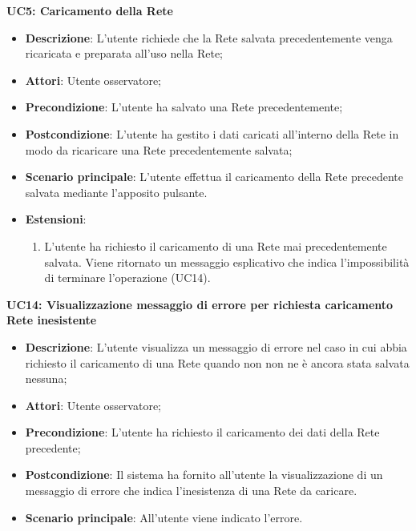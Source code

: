 \textbf{UC5: Caricamento della Rete}\mbox{}
\label{UC5: Caricamento della Rete}
\noindent
\begin{itemize}
\item \textbf{Descrizione}: L'utente richiede che la Rete salvata precedentemente venga ricaricata e preparata all'uso nella Rete;
\item \textbf{Attori}: Utente osservatore;
\item \textbf{Precondizione}: L'utente ha salvato una Rete precedentemente;
\item \textbf{Postcondizione}: L'utente ha gestito i dati caricati all'interno della Rete in modo da ricaricare una Rete precedentemente salvata;
\item \textbf{Scenario principale}: L'utente effettua il caricamento della Rete precedente salvata mediante l'apposito pulsante.
\item \textbf{Estensioni}:
\begin{enumerate}
\item L'utente ha richiesto il caricamento di una Rete mai precedentemente salvata. Viene ritornato un messaggio esplicativo che indica l'impossibilit\`a di terminare l'operazione (UC14).
\end{enumerate}
\end{itemize}

\textbf{UC14: Visualizzazione messaggio di errore per richiesta caricamento Rete inesistente}\mbox{}
\label{UC14: Visualizzazione messaggio di errore per richiesta caricamento Rete inesistente}
\noindent
\begin{itemize}
\item \textbf{Descrizione}: L'utente visualizza un messaggio di errore nel caso in cui abbia richiesto il caricamento di una Rete quando non non ne \`e ancora stata salvata nessuna;
\item \textbf{Attori}: Utente osservatore;
\item \textbf{Precondizione}: L'utente ha richiesto il caricamento dei dati della Rete precedente;
\item \textbf{Postcondizione}: Il sistema ha fornito all'utente la visualizzazione di un messaggio di errore che indica l'inesistenza di una Rete da caricare.
\item \textbf{Scenario principale}: All'utente viene indicato l'errore.
\end{itemize}


